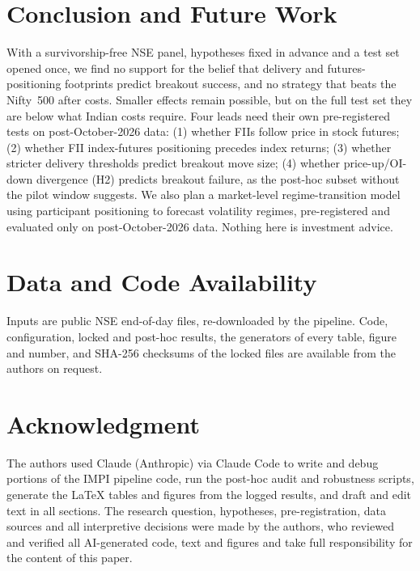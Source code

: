 \documentclass[conference]{IEEEtran}
\begin{document}
\section{Conclusion and Future Work}
With a survivorship-free NSE panel, hypotheses fixed in advance and a test set opened once, we find no support
for the belief that delivery and futures-positioning footprints predict breakout success, and no strategy that
beats the Nifty~500 after costs. Smaller effects remain possible, but on the full test set they are below what
Indian costs require. Four leads need their own pre-registered tests on post-October-2026 data: (1) whether
FIIs follow price in stock futures; (2) whether FII index-futures positioning precedes index returns; (3)
whether stricter delivery thresholds predict breakout move size; (4) whether price-up/OI-down divergence (H2)
predicts breakout failure, as the post-hoc subset without the pilot window suggests. We also plan a
market-level regime-transition model using participant positioning to forecast volatility regimes,
pre-registered and evaluated only on post-October-2026 data. Nothing here is investment advice.

\section*{Data and Code Availability}
Inputs are public NSE end-of-day files, re-downloaded by the pipeline. Code, configuration, locked and
post-hoc results, the generators of every table, figure and number, and SHA-256 checksums of the locked files
are available from the authors on request.

\section*{Acknowledgment}
The authors used Claude (Anthropic) via Claude Code to write and debug portions of the IMPI pipeline code,
run the post-hoc audit and robustness scripts, generate the \LaTeX{} tables and figures from the logged
results, and draft and edit text in all sections. The research question, hypotheses, pre-registration, data
sources and all interpretive decisions were made by the authors, who reviewed and verified all AI-generated
code, text and figures and take full responsibility for the content of this paper.

\FloatBarrier


\end{document}
